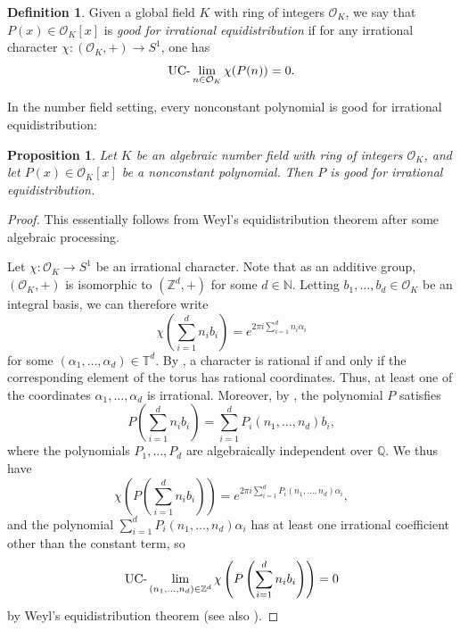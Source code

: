 \documentclass{amsart}
\newtheorem{proposition}[theorem]{Proposition}
\theoremstyle{definition}
\newtheorem{definition}[theorem]{Definition}
\numberwithin{equation}{section}
\newcommand{\N}{\mathbb{N}}
\newcommand{\Z}{\mathbb{Z}}
\newcommand{\Q}{\mathbb{Q}}
\newcommand{\T}{\mathbb{T}}
\newcommand{\mO}{\mathcal{O}}
\newcommand{\UClim}{\textup{UC-}\lim}
\begin{document}
\begin{definition} \label{defn: irrational equidistribution}
    Given a global field $K$ with ring of integers $\mO_K$, we say that $P(x) \in \mO_K[x]$ is \emph{good for irrational equidistribution} if for any irrational character $\chi : (\mO_K,+) \to S^1$, one has
    \begin{equation*}
            \UClim_{n \in \mO_K} \chi(P(n)) = 0.
    \end{equation*}    
\end{definition}

In the number field setting, every nonconstant polynomial is good for irrational equidistribution:

\begin{proposition} \label{prop: number field irrational equidistribution}
    Let $K$ be an algebraic number field with ring of integers $\mO_K$, and let $P(x) \in \mO_K[x]$ be a nonconstant polynomial.
    Then $P$ is good for irrational equidistribution.
\end{proposition}

\begin{proof}
    This essentially follows from Weyl's equidistribution theorem \cite{weyl} after some algebraic processing.

    Let $\chi : \mO_K \to S^1$ be an irrational character.
    Note that as an additive group, $(\mO_K,+)$ is isomorphic to $(\Z^d,+)$ for some $d \in \N$.
    Letting $b_1, \ldots, b_d \in \mO_K$ be an integral basis, we can therefore write
    \begin{equation*}
        \chi \left( \sum_{i=1}^d n_i b_i \right) = e^{2\pi i \sum_{i=1}^d n_i\alpha_i}
    \end{equation*}
    for some $(\alpha_1, \ldots, \alpha _d) \in \T^d$.
    By \cite[Lemma 2.1]{ab-roi}, a character is rational if and only if the corresponding element of the torus has rational coordinates.
    Thus, at least one of the coordinates $\alpha_1, \ldots, \alpha_d$ is irrational.
    Moreover, by \cite[Proposition 2.9]{ab-roi}, the polynomial $P$ satisfies
    \begin{equation*}
        P \left( \sum_{i=1}^d n_i b_i \right) = \sum_{i=1}^d P_i(n_1, \ldots, n_d) b_i,
    \end{equation*}
    where the polynomials $P_1, \ldots, P_d$ are algebraically independent over $\Q$.
    We thus have
    \begin{equation*}
        \chi \left( P \left( \sum_{i=1}^d n_i b_i \right) \right) = e^{2\pi i \sum_{i=1}^d P_i(n_1, \ldots, n_d)\alpha_i},
    \end{equation*}
    and the polynomial $\sum_{i=1}^d P_i(n_1, \ldots, n_d)\alpha_i$ has at least one irrational coefficient other than the constant term, so
    \begin{equation*}
        \UClim_{(n_1, \ldots, n_d) \in \Z^d} \chi \left( P \left( \sum_{i=1}^d n_i b_i \right) \right) = 0
    \end{equation*}
    by Weyl's equidistribution theorem \cite[Satz 20]{weyl} (see also \cite[Remark 3.10]{ab-roi}).
\end{proof}
\end{document}

